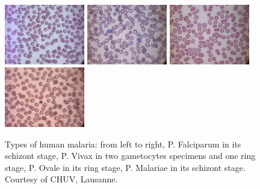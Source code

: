 \documentclass[sensors,review,submit,moreauthors,pdftex,10pt,a4paper]{mdpi}
\begin{document}
	\iftrue
	\begin{figure}[!t]
		\centering
		\includegraphics[width=3.5cm]{img/f2_Pfalciparum}
		\includegraphics[width=3.5cm]{img/f2_Pvivax}
		\includegraphics[width=3.5cm]{img/f2_Povale}
		\includegraphics[width=3.5cm]{img/f2_Pmalariae}
		\caption{\label{fig:malaria_types}Types of human malaria: from left to right, P. Falciparum in its schizont stage, P. Vivax in two gametocytes specimens and one ring stage, P. Ovale in its ring stage, P. Malariae in its schizont stage.\newline
			Courtesy of CHUV, Lausanne.}
	\end{figure}
	\fi
	
\end{document}
